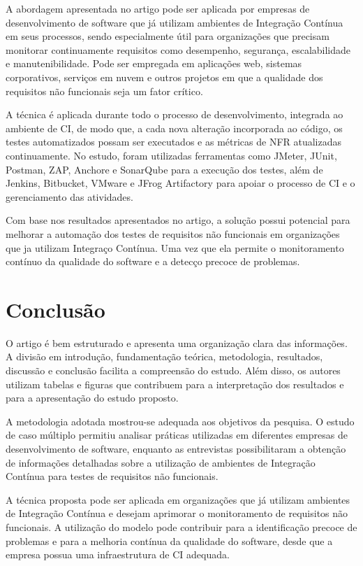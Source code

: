 \documentclass[12pt]{article}
\begin{document}
A abordagem apresentada no artigo pode ser aplicada por empresas de desenvolvimento de software que já utilizam ambientes de Integração Contínua em seus processos, sendo especialmente útil para organizações que precisam monitorar continuamente requisitos como desempenho, segurança, escalabilidade e manutenibilidade. Pode ser empregada em aplicações web, sistemas corporativos, serviços em nuvem e outros projetos em que a qualidade dos requisitos não funcionais seja um fator crítico.

A técnica é aplicada durante todo o processo de desenvolvimento, integrada ao ambiente de CI, de modo que, a cada nova alteração incorporada ao código, os testes automatizados possam ser executados e as métricas de NFR atualizadas continuamente. No estudo, foram utilizadas ferramentas como JMeter, JUnit, Postman, ZAP, Anchore e SonarQube para a execução dos testes, além de Jenkins, Bitbucket, VMware e JFrog Artifactory para apoiar o processo de CI e o gerenciamento das atividades.

Com base nos resultados apresentados no artigo, a solução possui potencial para melhorar a automação dos testes de requisitos não funcionais em organizações que ja utilizam Integraço Contínua. Uma vez que ela permite o monitoramento contínuo da qualidade do software e a detecço precoce de problemas.

\section{Conclusão}

O artigo é bem estruturado e apresenta uma organização clara das informações. A divisão em introdução, fundamentação teórica, metodologia, resultados, discussão e conclusão facilita a compreensão do estudo. Além disso, os autores utilizam tabelas e figuras que contribuem para a interpretação dos resultados e para a apresentação do estudo proposto.

A metodologia adotada mostrou-se adequada aos objetivos da pesquisa. O estudo de caso múltiplo permitiu analisar práticas utilizadas em diferentes empresas de desenvolvimento de software, enquanto as entrevistas possibilitaram a obtenção de informações detalhadas sobre a utilização de ambientes de Integração Contínua para testes de requisitos não funcionais.

A técnica proposta pode ser aplicada em organizações que já utilizam ambientes de Integração Contínua e desejam aprimorar o monitoramento de requisitos não funcionais. A utilização do modelo pode contribuir para a identificação precoce de problemas e para a melhoria contínua da qualidade do software, desde que a empresa possua uma infraestrutura de CI adequada.
\end{document}
